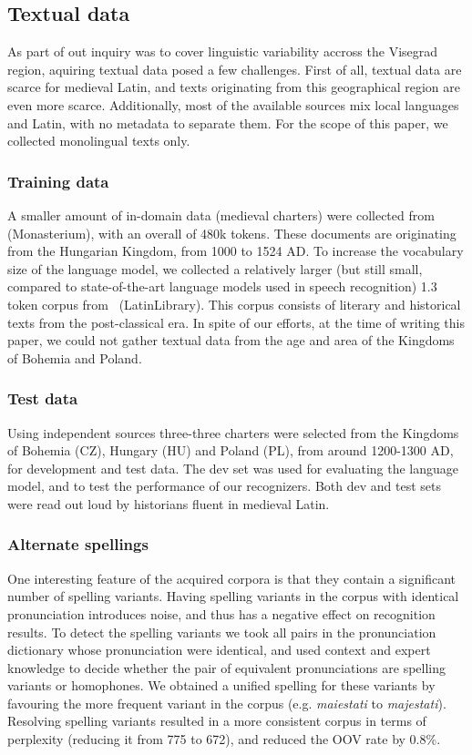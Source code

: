 \documentclass[runningheads,a4paper]{llncs}
\begin{document}
\subsection{Textual data}\label{text}
As part of out inquiry was to cover linguistic variability accross the Visegrad region, aquiring textual data posed a few challenges.
First of all, textual data are scarce for medieval Latin, and texts originating from this geographical region are even more scarce.
Additionally, most of the available sources mix local languages and Latin, with no metadata to separate them.
For the scope of this paper, we collected monolingual texts only.
\subsubsection{Training data}
A smaller amount of in-domain data (medieval charters) were collected from~\cite{monasterium} (Monasterium), with an overall of 480k tokens.
These documents are originating from the Hungarian Kingdom, from 1000 to 1524 AD.
To increase the vocabulary size of the language model, we collected a relatively larger (but still small, compared to state-of-the-art language models used in speech recognition) 1.3 token corpus from~\cite{latinlibrary} (LatinLibrary).
This corpus consists of literary and historical texts from the post-classical era.
In spite of our efforts, at the time of writing this paper, we could not gather textual data from the age and area of the Kingdoms of Bohemia and Poland.
\subsubsection{Test data}\label{textest}
Using independent sources three-three charters were selected from the Kingdoms of Bohemia (CZ), Hungary (HU) and Poland (PL), from around 1200-1300 AD, for development and test data.
The dev set was used for evaluating the language model, and to test the performance of our recognizers.
Both dev and test sets were read out loud by historians fluent in medieval Latin.
\subsubsection{Alternate spellings}
One interesting feature of the acquired corpora is that they contain a significant number of spelling variants.
Having spelling variants in the corpus with identical pronunciation introduces noise, and thus has a negative effect on recognition results.
To detect the spelling variants we took all pairs in the pronunciation dictionary whose pronunciation were identical, and used context and expert knowledge to decide whether the pair of equivalent pronunciations are spelling variants or homophones.
We obtained a unified spelling for these variants by favouring the more frequent variant in the corpus (e.g. \textit{maiestati} to \textit{majestati}).
Resolving spelling variants resulted in a more consistent corpus in terms of perplexity (reducing it from 775 to 672), and reduced the OOV rate by 0.8\%.
\end{document}
